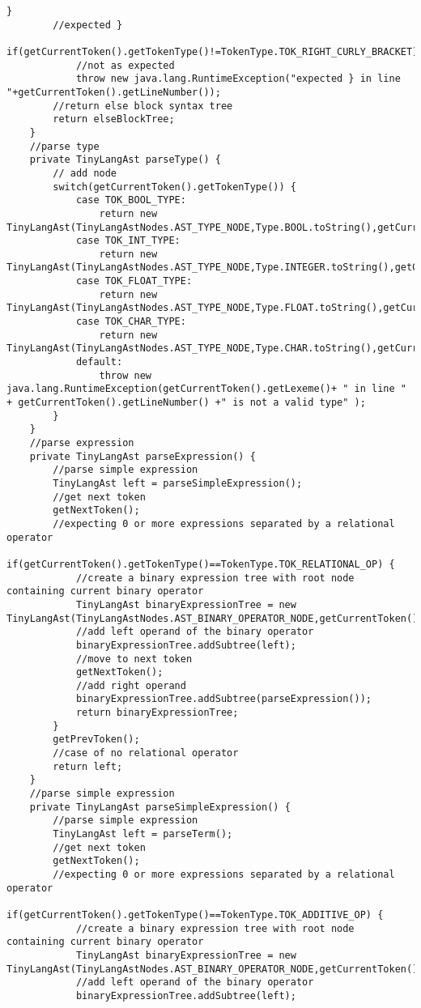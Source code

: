 \begin{lstlisting}[basicstyle=\miniscule,caption=Implementation of recursive descent parser,label=listing:rescursive descent parser implementation]
		}
		//expected }
		if(getCurrentToken().getTokenType()!=TokenType.TOK_RIGHT_CURLY_BRACKET) 
			//not as expected
			throw new java.lang.RuntimeException("expected } in line "+getCurrentToken().getLineNumber());	
		//return else block syntax tree
		return elseBlockTree;
	}
	//parse type
	private TinyLangAst parseType() {
		// add node
		switch(getCurrentToken().getTokenType()) {
			case TOK_BOOL_TYPE:
				return new TinyLangAst(TinyLangAstNodes.AST_TYPE_NODE,Type.BOOL.toString(),getCurrentToken().getLineNumber());
			case TOK_INT_TYPE:
				return new TinyLangAst(TinyLangAstNodes.AST_TYPE_NODE,Type.INTEGER.toString(),getCurrentToken().getLineNumber());
			case TOK_FLOAT_TYPE:
				return new TinyLangAst(TinyLangAstNodes.AST_TYPE_NODE,Type.FLOAT.toString(),getCurrentToken().getLineNumber());
			case TOK_CHAR_TYPE:
				return new TinyLangAst(TinyLangAstNodes.AST_TYPE_NODE,Type.CHAR.toString(),getCurrentToken().getLineNumber());
			default:
				throw new java.lang.RuntimeException(getCurrentToken().getLexeme()+ " in line " + getCurrentToken().getLineNumber() +" is not a valid type" );
		}
	}	
	//parse expression
	private TinyLangAst parseExpression() { 
		//parse simple expression
		TinyLangAst left = parseSimpleExpression();
		//get next token
		getNextToken();
		//expecting 0 or more expressions separated by a relational operator
		if(getCurrentToken().getTokenType()==TokenType.TOK_RELATIONAL_OP) {
			//create a binary expression tree with root node containing current binary operator
			TinyLangAst binaryExpressionTree = new TinyLangAst(TinyLangAstNodes.AST_BINARY_OPERATOR_NODE,getCurrentToken().getLexeme(),getCurrentToken().getLineNumber()); 
			//add left operand of the binary operator
			binaryExpressionTree.addSubtree(left);
			//move to next token
			getNextToken();
			//add right operand 
			binaryExpressionTree.addSubtree(parseExpression());	
			return binaryExpressionTree;
		}
		getPrevToken();
		//case of no relational operator
		return left;
	}
	//parse simple expression
	private TinyLangAst parseSimpleExpression() { 
		//parse simple expression
		TinyLangAst left = parseTerm();
		//get next token
		getNextToken();
		//expecting 0 or more expressions separated by a relational operator
		if(getCurrentToken().getTokenType()==TokenType.TOK_ADDITIVE_OP) {
			//create a binary expression tree with root node containing current binary operator
			TinyLangAst binaryExpressionTree = new TinyLangAst(TinyLangAstNodes.AST_BINARY_OPERATOR_NODE,getCurrentToken().getLexeme(),getCurrentToken().getLineNumber()); 
			//add left operand of the binary operator
			binaryExpressionTree.addSubtree(left);

\end{lstlisting}
